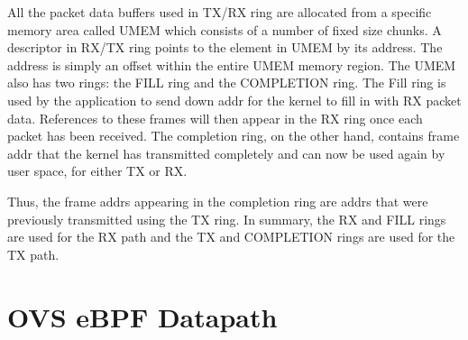 \documentclass[10pt]{sigplanconf}
\newcommand{\mycomment}[1]{}
\begin{document}
All the packet data buffers used in TX/RX ring are allocated from a specific
memory area called UMEM which consists of a number of fixed size chunks.
A descriptor in RX/TX ring points to the element in UMEM by its address.
The address is simply an offset within the entire UMEM memory region.
The UMEM also has two rings: the FILL ring and the COMPLETION ring.
The Fill ring is used by the application to send down addr for the kernel
to fill in with RX packet data. References to these frames will then
appear in the RX ring once each packet has been received. The 
completion ring, on the other hand, contains frame addr that the 
kernel has transmitted completely and can now be used again by user
space, for either TX or RX. 

Thus, the frame addrs appearing in the 
completion ring are addrs that were previously transmitted using the 
TX ring. In summary, the RX and FILL rings are used for the RX path
and the TX and COMPLETION rings are used for the TX path.


\section{OVS eBPF Datapath}
\mycomment{
\begin{figure}
{\scriptsize
\begin{verbatim}

               _
              |   +-------------------+
              |   |    ovs-vswitchd   |
              |   +-------------------+
    userspace |   |      ofproto      |<-->OpenFlow controllers
              |   +--------+-+--------+  
              |   | netdev | |ofproto-|
              |   +--------+ |  dpif  |
                  | netdev | +--------+
   *eBPF hook --> |provider| |  dpif  |
                  +---||---+ +--------+
              |       ||     |  dpif  | <--- *eBPF provider
              |       ||     |provider|
              |_      ||     +---||---+
                      ||         ||
               _  +---||-----+---||---+
              |   |          |datapath| <--- *eBPF datapath
       kernel |   |          +--------+
              |   |                   |
              |_  +--------||---------+
                           ||
                        physical
                           NIC
\end{verbatim}
}
\vspace{-1.0em}
\caption{An example of mirrored packet with outer header containing
the GRE and ERSPAN header, followed by the innter Ethernet frame.}
\label{erspanhdr}
\vspace{-1.0em}
\end{figure}
\subsection{Tunnel Support}
\subsection{Megaflow Support}
\subsection{Connection Tracking Support}
}
\end{document}
